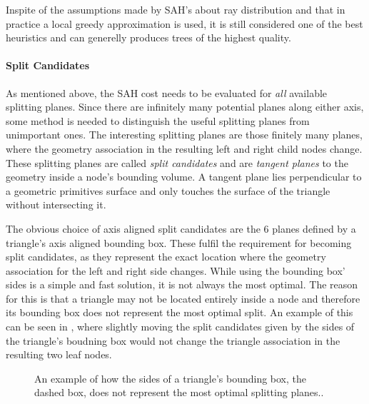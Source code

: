 Inspite of the assumptions made by SAH's about ray distribution and that in
practice a local greedy approximation is used, it is still considered one of the
best heuristics and can generelly produces trees of the highest quality.



\paragraph{Split Candidates}


As mentioned above, the SAH cost needs to be evaluated for \textit{all}
available splitting planes. Since there are infinitely many potential planes
along either axis, some method is needed to distinguish the useful splitting
planes from unimportant ones. The interesting splitting planes are those
finitely many planes, where the geometry association in the resulting left and
right child nodes change. These splitting planes are called \textit{split
  candidates} and are \textit{tangent planes} to the geometry inside a node's
bounding volume. A tangent plane lies perpendicular to a geometric primitives
surface and only touches the surface of the triangle without intersecting it.


The obvious choice of axis aligned split candidates are the 6 planes defined by
a triangle's axis aligned bounding box. These fulfil the requirement for
becoming split candidates, as they represent the exact location where the
geometry association for the left and right side changes. While using the
bounding box' sides is a simple and fast solution, it is not always the most
optimal. The reason for this is that a triangle may not be located entirely
inside a node and therefore its bounding box does not represent the most optimal
split. An example of this can be seen in , where slightly
moving the split candidates given by the sides of the triangle's boudning box
would not change the triangle association in the resulting two leaf nodes.

\begin{figure}
  \centering

  \vspace{3mm}
  \parbox{5cm}{\caption[Triangle/Node bounding box intersection.]{An
      example of how the sides of a triangle's bounding box, the
      dashed box, does not represent the most optimal splitting
      planes..}\label{fig:aabbSplit}}
\end{figure}

